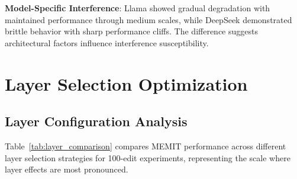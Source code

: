 \textbf{Model-Specific Interference}: Llama showed gradual degradation with maintained performance through medium scales, while DeepSeek demonstrated brittle behavior with sharp performance cliffs. The difference suggests architectural factors influence interference susceptibility.

\section{Layer Selection Optimization}
\label{sec:layer_optimization}

\subsection{Layer Configuration Analysis}
\label{subsec:layer_configuration}

Table~\ref{tab:layer_comparison} compares MEMIT performance across different layer selection strategies for 100-edit experiments, representing the scale where layer effects are most pronounced.

